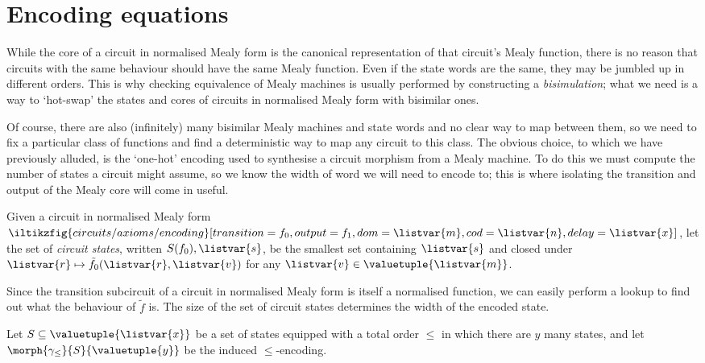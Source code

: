 \section{Encoding equations}

While the core of a circuit in normalised Mealy form is the canonical
representation of that circuit's Mealy function, there is no reason that
circuits with the same behaviour should have the same Mealy function.
Even if the state words are the same, they may be jumbled up in different
orders.
This is why checking equivalence of Mealy machines is usually performed by
constructing a \emph{bisimulation}; what we need is a way to `hot-swap' the
states and cores of circuits in normalised Mealy form with bisimilar ones.

Of course, there are also (infinitely) many bisimilar Mealy machines and state
words and no clear way to map between them, so we need to fix a particular
class of functions and find a deterministic way to map any circuit to this
class.
The obvious choice, to which we have previously alluded, is the `one-hot'
encoding used to synthesise a circuit morphism from a Mealy machine.
To do this we must compute the number of states a circuit might assume, so we
know the width of word we will need to encode to; this is where isolating the
transition and output of the Mealy core will come in useful.

\begin{definition}
    Given a circuit in normalised Mealy form \(
        \iltikzfig{circuits/axioms/encoding}[transition={f_0},output={f_1},dom=\listvar{m},cod=\listvar{n},delay=\listvar{x}]
    \), let the set of \emph{circuit states}, written \(S(f_0),\listvar{s}\),
    be the smallest set containing \(\listvar{s}\) and closed under \(
        \listvar{r} \mapsto \tilde{f}_0(\listvar{r},\listvar{v})
    \) for any \(\listvar{v} \in \valuetuple{\listvar{m}}\).
\end{definition}

Since the transition subcircuit of a circuit in normalised Mealy form is itself
a normalised function, we can easily perform a lookup to find out what the
behaviour of \(\tilde{f}\) is.
The size of the set of circuit states determines the width of the encoded state.

\begin{definition}[Translations]
    Let \(S \subseteq \valuetuple{\listvar{x}}\) be a set of states equipped
    with a total order \(\leq\) in which there are \(y\) many states, and let
    \(\morph{\gamma_\leq}{S}{\valuetuple{y}}\) be the induced \(\leq\)-encoding.
\end{definition}

